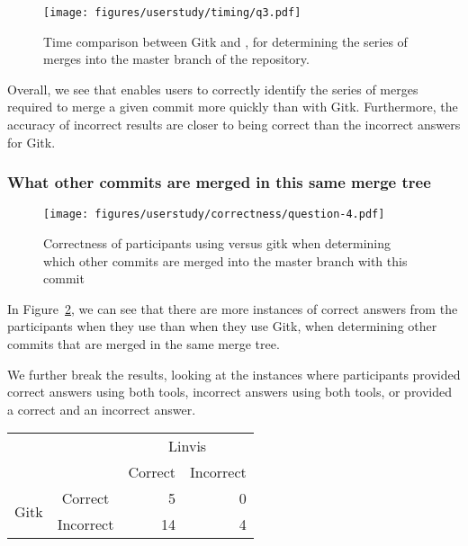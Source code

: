\begin{figure}[htpb]
  \centering
  \texttt{[image: figures/userstudy/timing/q3.pdf]}
  \caption{Time comparison between Gitk and \tool, for determining
    the series of merges into the master branch of the repository.}
  \label{fig:q3_timing}
\end{figure}

Overall, we see that \tool enables users to correctly identify the
series of merges required to merge a given commit more quickly than with
Gitk. Furthermore, the accuracy of incorrect results are closer to being
correct than the incorrect answers for Gitk.

\subsubsection{What other commits are merged in this same merge tree}
\label{ssub:what_other_commits_are_merged_in_this_same_merge_tree}

\begin{figure}[htpb]
  \centering
  \texttt{[image: figures/userstudy/correctness/question-4.pdf]}
  \caption{Correctness of participants using \tool versus gitk when
    determining which other commits are merged into the master branch
    with this commit}
  \label{fig:q_4_correctness}
\end{figure}

In Figure~\ref{fig:q_4_correctness}, we can see that there are more
instances of correct answers from the participants when they use \tool
than when they use Gitk, when determining other commits that are merged
in the same merge tree.

We further break the results, looking at the instances where
participants provided correct answers using both tools, incorrect
answers using both tools, or provided a correct and an incorrect answer.

\begin{center}
  \begin{tabular}{cc|rr}
                           &           & \multicolumn{2}{c}{Linvis}\\
                           &           & Correct                      & Incorrect\\\hline
    \multirow{2}{*}{Gitk}  & Correct   & 5                            & 0\\
                           & Incorrect & 14                           & 4\\
  \end{tabular}
\end{center}

